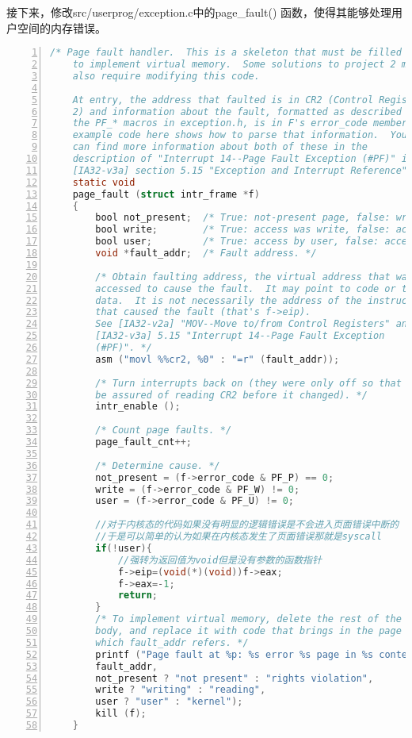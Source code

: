 \documentclass{article}
\begin{document}
	接下来，修改src/userprog/exception.c中的page\_fault() 函数，使得其能够处理用户空间的内存错误。
	
	\begin{lstlisting}[xleftmargin = 4em,xrightmargin = 4em, aboveskip = 1em, numbers = left, language = C,title=src/userprog/syscall.c - \texttt{page\_fault()}]
    /* Page fault handler.  This is a skeleton that must be filled in
    to implement virtual memory.  Some solutions to project 2 may
    also require modifying this code.
    
    At entry, the address that faulted is in CR2 (Control Register
    2) and information about the fault, formatted as described in
    the PF_* macros in exception.h, is in F's error_code member.  The
    example code here shows how to parse that information.  You
    can find more information about both of these in the
    description of "Interrupt 14--Page Fault Exception (#PF)" in
    [IA32-v3a] section 5.15 "Exception and Interrupt Reference". */
    static void
    page_fault (struct intr_frame *f) 
    {
    	bool not_present;  /* True: not-present page, false: writing r/o page. */
    	bool write;        /* True: access was write, false: access was read. */
    	bool user;         /* True: access by user, false: access by kernel. */
    	void *fault_addr;  /* Fault address. */
    	
    	/* Obtain faulting address, the virtual address that was
    	accessed to cause the fault.  It may point to code or to
    	data.  It is not necessarily the address of the instruction
    	that caused the fault (that's f->eip).
    	See [IA32-v2a] "MOV--Move to/from Control Registers" and
    	[IA32-v3a] 5.15 "Interrupt 14--Page Fault Exception
    	(#PF)". */
    	asm ("movl %%cr2, %0" : "=r" (fault_addr));
    	
    	/* Turn interrupts back on (they were only off so that we could
    	be assured of reading CR2 before it changed). */
    	intr_enable ();
    	
    	/* Count page faults. */
    	page_fault_cnt++;
    	
    	/* Determine cause. */
    	not_present = (f->error_code & PF_P) == 0;
    	write = (f->error_code & PF_W) != 0;
    	user = (f->error_code & PF_U) != 0;
    	
    	//对于内核态的代码如果没有明显的逻辑错误是不会进入页面错误中断的
    	//于是可以简单的认为如果在内核态发生了页面错误那就是syscall
    	if(!user){
    		//强转为返回值为void但是没有参数的函数指针
    		f->eip=(void(*)(void))f->eax;
    		f->eax=-1;
    		return;
    	}
    	/* To implement virtual memory, delete the rest of the function
    	body, and replace it with code that brings in the page to
    	which fault_addr refers. */
    	printf ("Page fault at %p: %s error %s page in %s context.\n",
    	fault_addr,
    	not_present ? "not present" : "rights violation",
    	write ? "writing" : "reading",
    	user ? "user" : "kernel");
    	kill (f);
    }
	\end{lstlisting}
	
\end{document}
